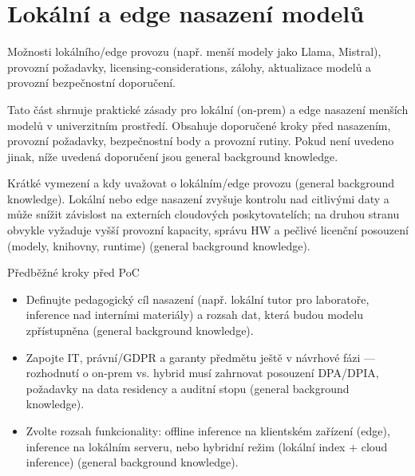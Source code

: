 \documentclass{report}%
\begin{document}
%
\section{Lokální a edge nasazení modelů}%
Možnosti lokálního/edge provozu (např. menší modely jako Llama, Mistral), provozní požadavky, licensing‑considerations, zálohy, aktualizace modelů a provozní bezpečnostní doporučení.%


%
Tato část shrnuje praktické zásady pro lokální (on‑prem) a edge nasazení menších modelů v univerzitním prostředí. Obsahuje doporučené kroky před nasazením, provozní požadavky, bezpečnostní body a provozní rutiny. Pokud není uvedeno jinak, níže uvedená doporučení jsou general background knowledge.

Krátké vymezení a kdy uvažovat o lokálním/edge provozu (general background knowledge).
Lokální nebo edge nasazení zvyšuje kontrolu nad citlivými daty a může snížit závislost na externích cloudových poskytovatelích; na druhou stranu obvykle vyžaduje vyšší provozní kapacity, správu HW a pečlivé licenční posouzení (modely, knihovny, runtime) (general background knowledge).

Předběžné kroky před PoC
\begin{itemize}
  \item Definujte pedagogický cíl nasazení (např. lokální tutor pro laboratoře, inference nad interními materiály) a rozsah dat, která budou modelu zpřístupněna (general background knowledge).
  \item Zapojte IT, právní/GDPR a garanty předmětu ještě v návrhové fázi — rozhodnutí o on‑prem vs. hybrid musí zahrnovat posouzení DPA/DPIA, požadavky na data residency a auditní stopu (general background knowledge).
  \item Zvolte rozsah funkcionality: offline inference na klientském zařízení (edge), inference na lokálním serveru, nebo hybridní režim (lokální index + cloud inference) (general background knowledge).
\end{itemize}
\end{document}
